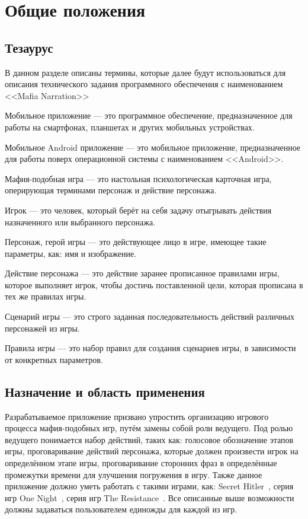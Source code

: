 \section{Общие положения}

\subsection{Тезаурус}

В данном разделе описаны термины, которые далее будут использоваться для описания технического задания программного обеспечения с наименованием <<Mafia Narration>>

Мобильное приложение --- это программное обеспечение, предназначенное для работы на смартфонах, планшетах и других мобильных устройствах.

Мобильное Android приложение --- это мобильное приложение, предназначенное для работы поверх операционной системы с наименованием <<Android>>.

Мафия-подобная игра --- это настольная психологическая карточная игра, оперирующая терминами персонаж и действие персонажа.

Игрок --- это человек, который берёт на себя задачу отыгрывать действия назначенного или выбранного персонажа.

Персонаж, герой игры --- это действующее лицо в игре, имеющее такие параметры, как: имя и изображение.

Действие персонажа --- это действие заранее прописанное правилами игры, которое выполняет игрок, чтобы достичь поставленной цели, которая прописана в тех же правилах игры.

Сценарий игры --- это строго заданная последовательность действий различных персонажей из игры.

Правила игры --- это набор правил для создания сценариев игры, в зависимости от конкретных параметров.

\subsection{Назначение и область применения}

Разрабатываемое приложение призвано упростить организацию игрового процесса мафия-подобных игр, путём замены собой роли ведущего. Под ролью ведущего понимается набор действий, таких как: голосовое обозначение этапов игры, проговаривание действий персонажа, которые должен произвести игрок на определённом этапе игры, проговаривание сторонних фраз в определённые промежутки времени для улучшения погружения в игру. Также данное приложение должно уметь работать с такими играми, как: Secret Hitler~\cite{hitler}, серия игр One Night~\cite{one-night-ultimate-werewolf, one-night-ultimate-werewolf-daybreak,one-night-ultimate-vampire,one-night-ultimate-alien}, серия игр The Resistance~\cite{resistance, avalon}. Все описанные выше возможности должны задаваться пользователем единожды для каждой из игр.
